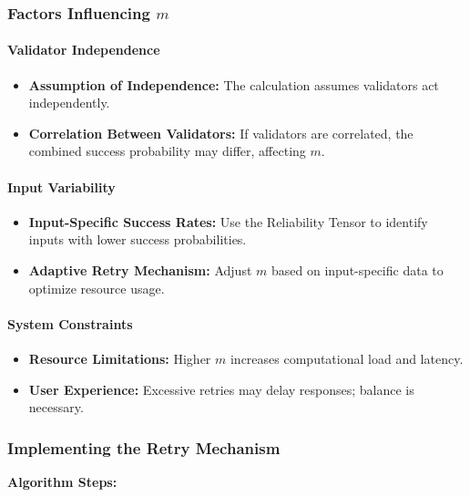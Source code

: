 \documentclass{article}
\begin{document}
\subsubsection{Factors Influencing \texorpdfstring{$m$}{m}}

\paragraph{Validator Independence}

\begin{itemize}
    \item \textbf{Assumption of Independence:} The calculation assumes validators act independently.
    \item \textbf{Correlation Between Validators:} If validators are correlated, the combined success probability may differ, affecting \( m \).
\end{itemize}

\paragraph{Input Variability}

\begin{itemize}
    \item \textbf{Input-Specific Success Rates:} Use the Reliability Tensor to identify inputs with lower success probabilities.
    \item \textbf{Adaptive Retry Mechanism:} Adjust \( m \) based on input-specific data to optimize resource usage.
\end{itemize}

\paragraph{System Constraints}

\begin{itemize}
    \item \textbf{Resource Limitations:} Higher \( m \) increases computational load and latency.
    \item \textbf{User Experience:} Excessive retries may delay responses; balance is necessary.
\end{itemize}

\subsubsection{Implementing the Retry Mechanism}

\textbf{Algorithm Steps:}
\end{document}
